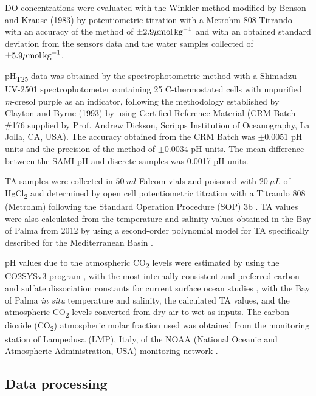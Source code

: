 DO concentrations were evaluated with the Winkler method modified by Benson
and Krause (1983) \cite{Benson_Krause_1984} by potentiometric titration with a
Metrohm 808 Titrando with an accuracy of the method of $\pm 2.9
        {\mu\textrm{mol\,kg}^{-1}}$ and with an obtained standard deviation
from the sensors data and the water samples collected of $\pm 5.9
        {\mu\textrm{mol\,kg}^{-1}}$.

pH\textsubscript{T25} data was obtained by the spectrophotometric method
with a Shimadzu UV-2501 spectrophotometer containing 25 \textdegree
C-thermostated cells with unpurified \emph{m}-cresol purple as an indicator,
following the methodology established by Clayton and Byrne (1993)
\cite{Clayton_Byrne_1993} by using Certified Reference	Material (CRM Batch
\#176 supplied by Prof. Andrew Dickson, Scripps  Institution  of  Oceanography,
La  Jolla,  CA,  USA). The accuracy obtained from the CRM Batch was $\pm0.0051$
pH units and the precision of the method  of $\pm0.0034$ pH units. The mean
difference between the SAMI-pH and discrete samples was 0.0017 pH units.

TA samples were collected in $\SI{50}{ml}$ Falcom vials and poisoned with
$\SI{20}{\mu L}$ of HgCl\textsubscript{2} and determined by open cell
potentiometric titration with a Titrando 808 (Metrohm) following the Standard
Operation Procedure (SOP) 3b \cite{Dickson2007}.
TA values were also calculated from the temperature and salinity values
obtained in the Bay of Palma from 2012 by using a second-order polynomial model
for TA specifically described for the Mediterranean Basin \cite{Gemayel2015}.

pH values due to the atmospheric CO\textsubscript{2} levels were estimated
by using the CO2SYSv3 program \cite{Sharp2020}, with the most internally
consistent and preferred carbon \cite{mehrbach1973,dickson1987} and sulfate
dissociation constants \cite{dickson1990} for current surface ocean
studies \cite{woosley2021}, with the Bay of Palma \emph{in situ} temperature
and salinity, the calculated TA values, and the atmospheric CO\textsubscript{2}
levels converted from dry air to wet \cite{weiss1980nitrous} as inputs. The
carbon dioxide (CO\textsubscript{2}) atmospheric molar fraction used was
obtained from the monitoring station of Lampedusa (LMP), Italy, of the NOAA
(National Oceanic and Atmospheric Administration, USA) monitoring network
\cite{Duglokencky2021}.

\subsection{Data processing}

